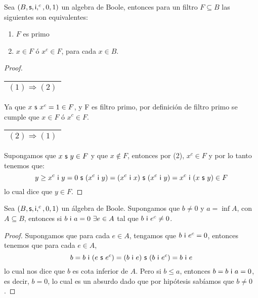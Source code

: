  \begin{lemma}
    \PN Sea $(B, \mathsf{s}, \mathsf{i}, ^{c}, 0, 1)$ un algebra de Boole, entonces para un filtro $F \subseteq B$ las siguientes son
    equivalentes:
    \begin{enumerate}[(1)]
      \item $F$ es primo
      \item $x \in F$ ó $x^{c} \in F$, para cada $x \in B$.
    \end{enumerate}
  \end{lemma}
  \begin{proof}
    \begin{tabular}{|c|} \hline $(1) \Rightarrow (2)$\\\hline \end{tabular} Ya que $x \ \mathsf{s} \ x^{c} = 1 \in F$, y F es
      filtro primo, por definición de filtro primo se cumple que $x \in F$ ó $x^{c} \in F$.

    \vspace{3mm}
    \begin{tabular}{|c|} \hline $(2) \Rightarrow (1)$\\\hline \end{tabular} Supongamos que $x \ \mathsf{s} \ y \in F$ y que
    $x \notin F$, entonces por (2), $x^{c} \in F$ y por lo tanto tenemos que:
    \[
      y \geq x^{c} \ \IN \ y = 0 \ \SU \ (x^{c} \ \IN \ y) = (x^{c} \ \IN \ x) \ \SU \ (x^{c} \ \IN \ y) = x^{c} \ \IN \
      (x \ \SU \ y) \in F
    \]
    \PN lo cual dice que $y \in F$.
  \end{proof}

  \begin{lemma} \label{lemma_27}
    \PN Sea $(B, \mathsf{s}, \mathsf{i}, ^{c}, 0, 1)$ un álgebra de Boole. Supongamos que $b \neq 0$ y $a = \inf A$, con $A \subseteq
    B$, entonces si $b \ \mathsf{i} \ a = 0 \ \exists e \in A$ tal que $b \ \mathsf{i} \ e^{c} \neq 0$.
  \end{lemma}
  \begin{proof}
    \PN Supongamos que para cada $e \in A$, tengamos que $b \ \mathsf{i} \ e^{c} = 0$, entonces tenemos que para cada
    $e \in A$,
    \[
      b = b \ \mathsf{i} \ (e \ \mathsf{s} \ e^{c}) = (b \ \mathsf{i} \ e)\ \mathsf{s} \ (b \ \mathsf{i} \ e^{c}) = b \ \mathsf{i} \ e
    \]
    \PN lo cual nos dice que $b$ es cota inferior de $A$. Pero si $b \leq a$, entonces $b = b \ \mathsf{i} \ a = 0$, es decir,
    $b = 0$, lo cual es un absurdo dado que por hipótesis sabíamos que $b \neq 0$.
  \end{proof}

